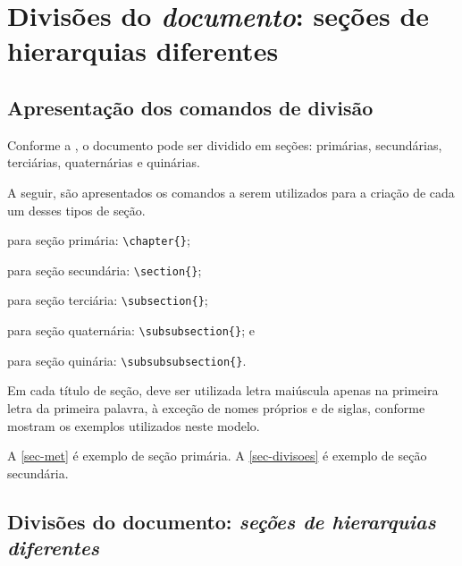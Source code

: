 \section{Divisões do {\normalfont \bfseries \itshape documento}: seções de hierarquias diferentes}\label{sec-divisoes}

\subsection{Apresentação dos comandos de divisão}

Conforme a , o documento pode ser dividido em seções: primárias, secundárias, terciárias, quaternárias e quinárias.

A seguir, são apresentados os comandos a serem utilizados para a criação de cada um desses tipos de seção.

\begin{alineas}
    \item para seção primária: \verb|\chapter{}|;
    \item para seção secundária: \verb|\section{}|;
    \item para seção terciária: \verb|\subsection{}|;
    \item para seção quaternária: \verb|\subsubsection{}|; e
    \item para seção quinária: \verb|\subsubsubsection{}|.
\end{alineas}

Em cada título de seção, deve ser utilizada letra maiúscula apenas na primeira letra da primeira palavra, à exceção de nomes próprios e de siglas, conforme mostram os exemplos utilizados neste modelo.

A \autoref{sec-met} é exemplo de seção primária. A \autoref{sec-divisoes} é exemplo de seção secundária.

\subsection{Divisões do documento: \normalfont \itshape seções de hierarquias diferentes}\label{sec-terc-1}


